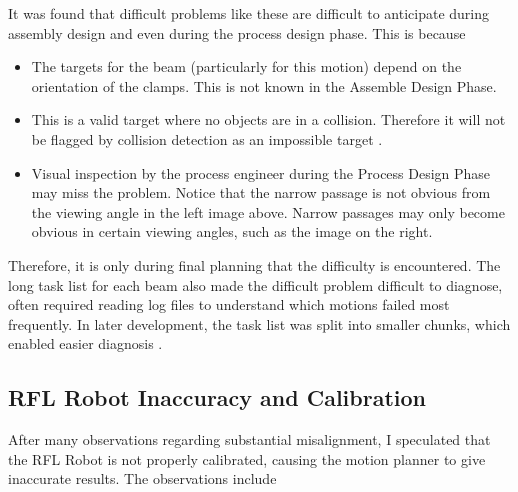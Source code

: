 


It was found that difficult problems like these are difficult to anticipate during assembly design and even during the process design phase. This is because 

\begin{itemize}
	\item The targets for the beam (particularly for this motion) depend on the orientation of the clamps. This is not known in the Assemble Design Phase.

	\item This is a valid target where no objects are in a collision. Therefore it will not be flagged by collision detection as an impossible target .

	\item Visual inspection by the process engineer during the Process Design Phase may miss the problem. Notice that the narrow passage is not obvious from the viewing angle in the left image above. Narrow passages may only become obvious in certain viewing angles, such as the image on the right.

\end{itemize}
Therefore, it is only during final planning that the difficulty is encountered. The long task list for each beam also made the difficult problem difficult to diagnose, often required reading log files to understand which motions failed most frequently. In later development, the task list was split into smaller chunks, which enabled easier diagnosis . 

\subsection{RFL Robot Inaccuracy and Calibration}
\label{subsection:exploration-3-rfl-robot-inaccuracy-and-calibration}

After many observations regarding substantial misalignment, I speculated that the RFL Robot is not properly calibrated, causing the motion planner to give inaccurate results. The observations include

